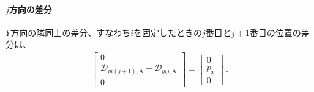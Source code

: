 \paragraph*{$j$方向の差分}\noindent
$Y$方向の隣同士の差分、すなわち$i$を固定したときの$j$番目と$j+1$番目の位置の差分は、
\begin{align*}
  \left[
  \begin{array}{c}
    0\\
    \mathcal D_{yi(j+1),\mathrm A}-\mathcal D_{yij,\mathrm A}\\
    0
  \end{array}
  \right]
  = \left[
    \begin{array}{c}
      0\\
      p_x\\
      0
    \end{array}
    \right]\ .
\end{align*}


